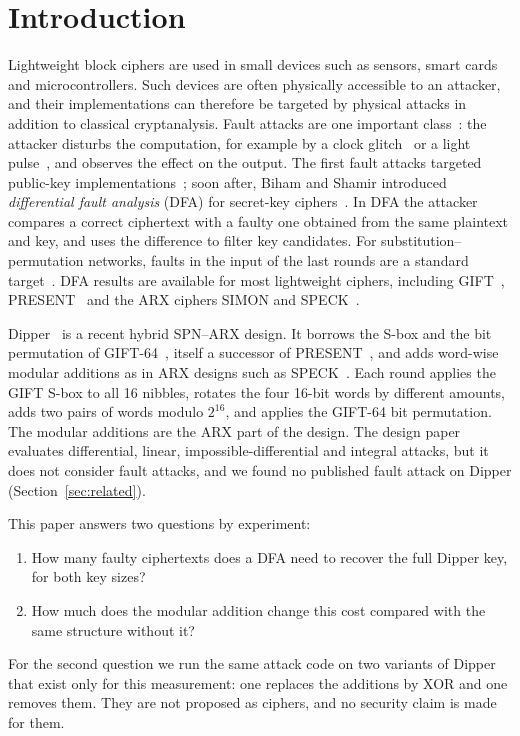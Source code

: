 \documentclass[pdflatex,sn-mathphys-num]{sn-jnl}
\theoremstyle{thmstyleone}%
\theoremstyle{thmstylethree}%
\begin{document}
\section{Introduction}\label{sec:intro}

Lightweight block ciphers are used in small devices such as sensors, smart cards and
microcontrollers. Such devices are often physically accessible to an attacker, and their
implementations can therefore be targeted by physical attacks in addition to classical
cryptanalysis. Fault attacks are one important class~\cite{BarEl2006,Barenghi2012}: the
attacker disturbs the computation, for example by a clock glitch~\cite{Agoyan2010} or a light
pulse~\cite{Skorobogatov2002}, and observes the effect on the output. The first fault attacks targeted
public-key implementations~\cite{Boneh1997}; soon after, Biham and Shamir introduced
\emph{differential fault analysis} (DFA) for secret-key ciphers~\cite{Biham1997}. In DFA the attacker
compares a correct ciphertext with a faulty one obtained from the same plaintext and key, and uses the
difference to filter key candidates. For substitution--permutation networks, faults in the input of the
last rounds are a standard target~\cite{PiretQ2003,Tunstall2011}. DFA results are available for most
lightweight ciphers, including GIFT~\cite{Xie2021,Luo2021,Saha2018,Gao2024,Kundu2025},
PRESENT~\cite{Bagheri2013,Patranabis2017} and the ARX ciphers SIMON and
SPECK~\cite{Tupsamudre2014,Huo2015}.

Dipper~\cite{Dipper2026} is a recent hybrid SPN--ARX design. It borrows the S-box and the bit
permutation of GIFT-64~\cite{Banik2017}, itself a successor of PRESENT~\cite{Bogdanov2007}, and adds
word-wise modular additions as in ARX designs such as SPECK~\cite{Beaulieu2015}. Each round applies the
GIFT S-box to all 16 nibbles, rotates the four 16-bit words by different amounts, adds two pairs of words modulo
$2^{16}$, and applies the GIFT-64 bit permutation. The modular additions are the ARX part of the
design. The design paper evaluates differential, linear, impossible-differential
and integral attacks, but it does not consider fault attacks, and we found no published fault attack
on Dipper (Section~\ref{sec:related}).

This paper answers two questions by experiment:
\begin{enumerate}
\item How many faulty ciphertexts does a DFA need to recover the full Dipper key, for both key sizes?
\item How much does the modular addition change this cost compared with the same structure without it?
\end{enumerate}
For the second question we run the same attack code on two variants of Dipper that exist only for
this measurement: one replaces the additions by XOR and one removes them. They are not proposed as
ciphers, and no security claim is made for them.
\end{document}
